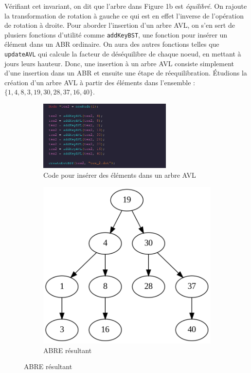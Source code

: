 \documentclass[10pt]{article} %
\begin{document}
Vérifiant cet invariant, on dit que l'arbre dans Figure 1b est \textit{équilibré}. On rajoute la transformation de rotation à gauche ce qui est en
effet l'inverse de l'opération de rotation à droite. Pour aborder l'insertion d'un arbre AVL, on s'en sert de plusiers fonctions d'utilité comme
\texttt{addKeyBST}, une fonction pour insérer un élément dans un ABR ordinaire. On aura des autres fonctions telles que \texttt{updateAVL} qui calcule
la facteur de déséquilibre de chaque noeud, en mettant à jours leurs hauteur. Donc, une insertion à un arbre AVL consiste simplement d'une insertion dans un
ABR et ensuite une étape de réequilibration. Étudions la création d'un arbre AVL à partir des éléments dans l'ensemble : $\{1, 4, 8, 3, 19, 30, 28, 37, 16, 40\}$.


\begin{figure}[h!]
    \centering
    \begin{subfigure}{.5\textwidth}
      \centering
      \includegraphics[height=3.5cm]{media/tex_2_source.png}
      \caption{Code pour insérer des éléments dans un arbre AVL}
      \label{fig:tex2_source}
    \end{subfigure}%
    \begin{subfigure}{.5\textwidth}
      \centering
      \includegraphics[width=.4\linewidth]{media/tex_2.png}
      \caption{ABRE résultant}
      \label{fig:tex2_dot}
    \end{subfigure}
    \label{fig:tex_2}
    \end{figure}
\end{document}
